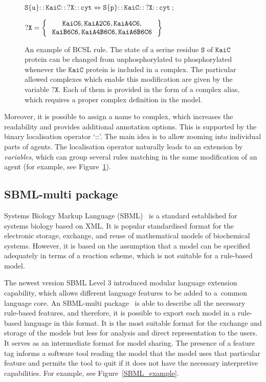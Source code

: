 \documentclass[11pt,a4paper]{report}
\begin{document}
\begin{figure}[!h]
	\begin{center}
		$ \mathtt{S\{u\}{::}KaiC{::}?X{::}cyt \Leftrightarrow S\{p\}{::}KaiC{::}?X{::}cyt} ~;~$\vspace*{0.3cm}
		
		$ \mathtt{?X} = \Set{
			\begin{array}{c}
			\mathtt{KaiC6}, \mathtt{KaiA2C6}, \mathtt{KaiA4C6},\\
			\mathtt{KaiB6C6}, \mathtt{KaiA4B6C6}, \mathtt{KaiA6B6C6}
			\end{array}
		}$
	\end{center}
	\caption{An example of BCSL rule. The state of a serine residue $\mathtt{S}$ of $\mathtt{KaiC}$ protein can be changed from unphosphorylated to phosphorylated whenever the $\mathtt{KaiC}$ protein is included in a complex. The particular allowed complexes which enable this modification are given by the variable $\mathtt{?X}$. Each of them is provided in the form of a complex alias, which requires a proper complex definition in the model.}
	\label{BCSL_rule}
\end{figure}

Moreover, it is possible to assign a name to complex, which increases the readability and provides additional annotation options. This is supported by the binary localisation operator `{::}'. The main idea is to allow zooming into individual parts of agents. The localisation operator naturally leads to an extension by \emph{variables}, which can group several rules matching in the same modification of an agent (for example, see Figure~\ref{BCSL_rule}).

\subsection{SBML-multi package}

Systems Biology Markup Language (SBML)~\cite{hucka2003systems} is a standard established for systems biology based on XML. It is popular standardised format for the electronic storage, exchange, and reuse of mathematical models of biochemical systems. However, it is based on the assumption that a model can be specified adequately in terms of a reaction scheme, which is not suitable for a rule-based model.

The newest version SBML Level 3 introduced modular language extension capability, which allows different language features to be added to a~common language core. An SBML-multi package~\cite{SBMLmulti} is able to describe all the necessary rule-based features, and therefore, it is possible to export each model in a rule-based language in this format. It is the most suitable format for the exchange and storage of the models but less for analysis and direct representation to the users. It serves as an intermediate format for model sharing. The presence of a feature tag informs a software tool reading the model that the model uses that particular feature and permits the tool to quit if it does not have the necessary interpretive capabilities. For example, see Figure~\ref{SBML_example}.
\end{document}
